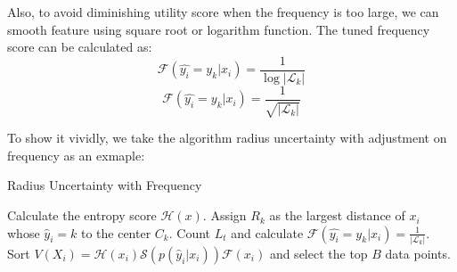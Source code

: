     
Also, to avoid diminishing utility score when the frequency is too large,
we can smooth feature using square root or logarithm function. 
The tuned frequency score can be calculated as: 
    $$\mathcal{F}(\hat{y_i} = y_k|x_i) = \frac{1}{\log{|\mathcal{L}_k|}}$$    
    $$\mathcal{F}(\hat{y_i} = y_k|x_i) = \frac{1}{\sqrt{|\mathcal{L}_k|}}$$  
    
To show it vividly, we take the algorithm radius uncertainty with adjustment on frequency as an exmaple:
 \begin{algorithm}
\caption{Radius Uncertainty with Frequency}
\label{alg:RUF}
\begin{algorithmic}
\REPEAT 
\STATE Calculate the entropy score $\mathcal{H}(x)$.
\STATE Assign $R_k$ as the largest distance of $x_i$ whose $\hat{y}_i = k$ to the center $C_k$.
\STATE Count $L_t$ and calculate $\mathcal{F}(\hat{y_i} = y_k|x_i) = \frac{1}{|\mathcal{L}_k|}$.
\STATE Sort $V(X_i) = \mathcal{H}(x_i) \mathcal{S}(p(\hat{y}_i|x_i)) \mathcal{F}(x_i)$ and select the top $B$ data points.
\end{algorithmic}
\end{algorithm}
    
